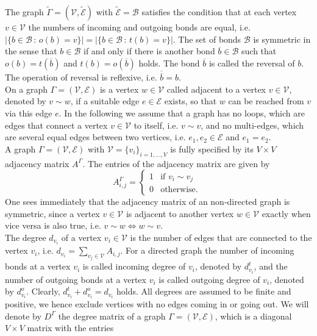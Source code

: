 The graph $\widetilde{\Gamma} = (\mathcal{V}, \widetilde{\mathcal{E}})$ with $\widetilde{\mathcal{E}} = \mathcal{B}$ satisfies the condition that at each vertex $v \in \mathcal{V}$ the numbers of incoming and outgoing bonds are equal, i.e. $\left\lvert \{ b \in \mathcal{B} \, \colon \, o(b) = v \} \right\rvert = \left\lvert \{ b \in \mathcal{B} \, \colon \, t(b) = v \} \right\rvert$. The set of bonds $\mathcal{B}$ is symmetric in the sense that $b \in \mathcal{B}$ if and only if there is another bond $\overline{b} \in \mathcal{B}$ such that $o(b) = t(\overline{b})$ and $t(b) = o(\overline{b})$ holds. The bond $\overline{b}$ is called the reversal of $b$. The operation of reversal is reflexive, i.e. $\overline{\overline{b}} = b$. \\
On a graph $\Gamma = (\mathcal{V}, \mathcal{E})$ is a vertex $w \in \mathcal{V}$ called adjacent to a vertex $v \in \mathcal{V}$, denoted by $v \sim w$, if a suitable edge $e \in \mathcal{E}$ exists, so that $w$ can be reached from $v$ via this edge $e$. In the following we assume that a graph has no loops, which are edges that connect a vertex $v \in \mathcal{V}$ to itself, i.e. $v \sim v$, and no multi-edges, which are several equal edges between two vertices, i.e. $e_1, e_2 \in \mathcal{E}$ and $e_1 = e_2$. \\
A graph $\Gamma = (\mathcal{V}, \mathcal{E})$ with $\mathcal{V} = \{v_i\}_{i = 1, \ldots, V}$ is fully specified by its $V \times V$ adjacency matrix $A^{\Gamma}$. The entries of the adjacency matrix are given by
\begin{equation}
    \label{adjacency matrix}
    A^{\Gamma}_{i, j}= \begin{cases} 1 & \text{if } v_i \sim v_j \\ 0 & \text{otherwise. } \end{cases}
\end{equation}
One sees immediately that the adjacency matrix of an non-directed graph is symmetric, since a vertex $v \in \mathcal{V}$ is adjacent to another vertex $w \in \mathcal{V}$ exactly when vice versa is also true, i.e. $v \sim w \Leftrightarrow w \sim v$. \\
The degree $d_{v_i}$ of a vertex $v_i \in \mathcal{V}$ is the number of edges that are connected to the vertex $v_i$, i.e. $d_{v_i} = \sum_{v_j \in \mathcal{V}} A_{i, j}$. For a directed graph the number of incoming bonds at a vertex $v_i$ is called incoming degree of $v_i$, denoted by $d^{t}_{v_i}$, and the number of outgoing bonds at a vertex $v_i$ is called outgoing degree of $v_i$, denoted by $d^{o}_{v_i}$. Clearly, $d^{t}_{v_i} + d^{o}_{v_i} = d_{v_i}$ holds. All degrees are assumed to be finite and positive, we hence exclude vertices with no edges coming in or going out. We will denote by $D^{\Gamma}$ the degree matrix of a graph $\Gamma = (\mathcal{V}, \mathcal{E})$, which is a diagonal $V \times V$ matrix with the entries
